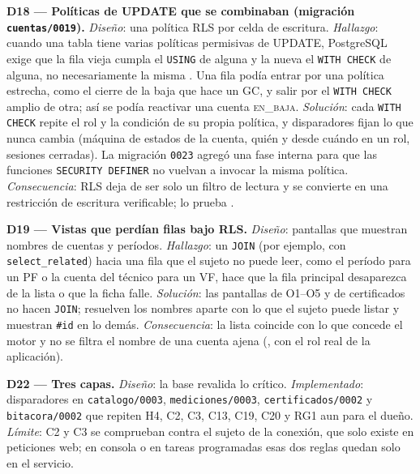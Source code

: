 \documentclass[10pt,letterpaper]{article}
\newcommand{\cod}[1]{\texttt{#1}}
\begin{document}
\textbf{D18 — Políticas de UPDATE que se combinaban (migración \cod{cuentas/0019}).} \emph{Diseño}: una política RLS por celda de escritura. \emph{Hallazgo}: cuando una tabla tiene varias políticas permisivas de UPDATE, PostgreSQL exige que la fila vieja cumpla el \cod{USING} de alguna y la nueva el \cod{WITH CHECK} de alguna, no necesariamente la misma \cite{pg-rls}. Una fila podía entrar por una política estrecha, como el cierre de la baja que hace un GC, y salir por el \cod{WITH CHECK} amplio de otra; así se podía reactivar una cuenta \textsc{en\_baja}. \emph{Solución}: cada \cod{WITH CHECK} repite el rol y la condición de su propia política, y disparadores fijan lo que nunca cambia (máquina de estados de la cuenta, quién y desde cuándo en un rol, sesiones cerradas). La migración \cod{0023} agregó una fase interna para que las funciones \cod{SECURITY DEFINER} no vuelvan a invocar la misma política. \emph{Consecuencia}: RLS deja de ser solo un filtro de lectura y se convierte en una restricción de escritura verificable; lo prueba .

\textbf{D19 — Vistas que perdían filas bajo RLS.} \emph{Diseño}: pantallas que muestran nombres de cuentas y períodos. \emph{Hallazgo}: un \cod{JOIN} (por ejemplo, con \cod{select\_related}) hacia una fila que el sujeto no puede leer, como el período para un PF o la cuenta del técnico para un VF, hace que la fila principal desaparezca de la lista o que la ficha falle. \emph{Solución}: las pantallas de O1--O5 y de certificados no hacen \cod{JOIN}; resuelven los nombres aparte con lo que el sujeto puede listar y muestran \cod{\#id} en lo demás. \emph{Consecuencia}: la lista coincide con lo que concede el motor y no se filtra el nombre de una cuenta ajena (, con el rol real de la aplicación).

\textbf{D22 — Tres capas.} \emph{Diseño}: la base revalida lo crítico. \emph{Implementado}: disparadores en \cod{catalogo/0003}, \cod{mediciones/0003}, \cod{certificados/0002} y \cod{bitacora/0002} que repiten H4, C2, C3, C13, C19, C20 y RG1 aun para el dueño. \emph{Límite}: C2 y C3 se comprueban contra el sujeto de la conexión, que solo existe en peticiones web; en consola o en tareas programadas esas dos reglas quedan solo en el servicio.
\end{document}
